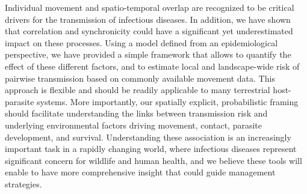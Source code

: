 \documentclass[letterpaper]{article}
\begin{document}
Individual movement and spatio-temporal overlap are recognized to be critical drivers for the transmission of infectious diseases. In addition, we have shown that correlation and synchronicity could have a significant yet underestimated impact on these processes. Using a model defined from an epidemiological perspective, we have provided a simple framework that allows to quantify the effect of these different factors, and to estimate local and landscape-wide risk of pairwise transmission based on commonly available movement data. This approach is flexible and should be readily applicable to many terrestrial host-parasite systems. More importantly, our spatially explicit, probabilistic framing should facilitate understanding the links between transmission risk and underlying environmental factors driving movement, contact, parasite development, and survival. Understanding these association is an increasingly important task in a rapidly changing world, where infectious diseases represent significant concern for wildlife and human health, and we believe these tools will enable to have more comprehensive insight that could guide management strategies. 




\end{document}
